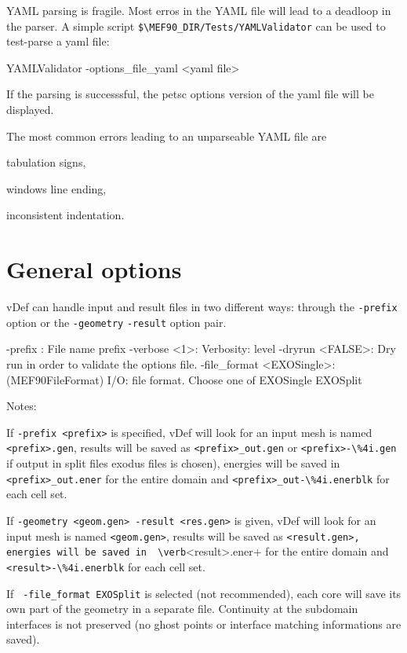 \documentclass[10pt,oneside]{memoir}
\begin{document}
YAML parsing is fragile.  Most erros in the YAML file will lead to a deadloop in the parser. A simple script \verb+$\MEF90_DIR/Tests/YAMLValidator+ can be used to test-parse a yaml file:
\begin{boxedverbatim}
YAMLValidator -options_file_yaml <yaml file>
\end{boxedverbatim}
If the parsing is successsful, the petsc options version of the yaml file will be displayed.

The most common errors leading to an unparseable YAML file are
\begin{compactenum}
    \item tabulation signs,
    \item windows line ending,
    \item inconsistent indentation.
\end{compactenum}

\section{General options}

vDef can handle input and result files in two different ways: through the \verb+-prefix+ option or the \verb+-geometry+ \verb+-result+ option pair.

\begin{boxedverbatim}
-prefix : File name prefix
-verbose <1>: Verbosity: level 
-dryrun <FALSE>: Dry run in order to validate the options file. 
-file_format <EXOSingle>: (MEF90FileFormat) I/O: file format. 
                          Choose one of EXOSingle EXOSplit
\end{boxedverbatim}
Notes: 
\begin{compactenum}
    \item  If \verb+-prefix <prefix>+ is specified, vDef will look for an input mesh is named \verb+<prefix>.gen+, results will be saved as \verb+<prefix>_out.gen+ or \verb+<prefix>-\%4i.gen+ if output in split files exodus files is chosen), energies will be saved in  \verb+<prefix>_out.ener+ for the entire domain and \verb+<prefix>_out-\%4i.enerblk+ for each cell set.
    \item If \verb+-geometry <geom.gen> -result <res.gen>+ is given, vDef will look for an input mesh is named \verb+<geom.gen>+, results will be saved as \verb+<result.gen>, energies will be saved in  \verb+<result>.ener+ for the entire domain and \verb+<result>-\%4i.enerblk+ for each cell set.
    \item If \verb+ -file_format EXOSplit+ is selected (not recommended), each core will save its own part of the geometry in a separate file. Continuity at the subdomain interfaces is not preserved (no ghost points or interface matching informations are saved).
\end{compactenum}
\end{document}
